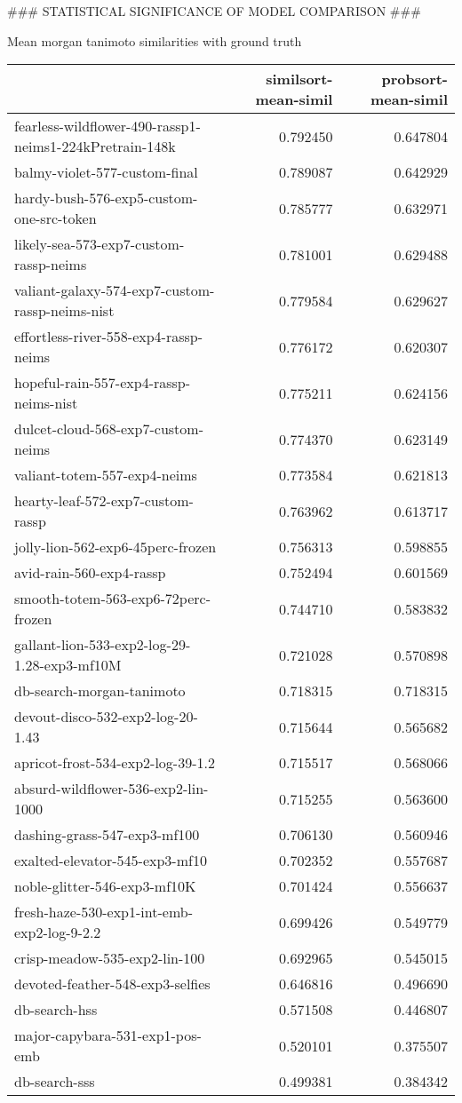### STATISTICAL SIGNIFICANCE OF MODEL COMPARISON ###


Mean morgan tanimoto similarities with ground truth
\begin{tabular}{lrr}
\toprule
 & similsort-mean-simil & probsort-mean-simil \\
\midrule
fearless-wildflower-490-rassp1-neims1-224kPretrain-148k & 0.792450 & 0.647804 \\
balmy-violet-577-custom-final & 0.789087 & 0.642929 \\
hardy-bush-576-exp5-custom-one-src-token & 0.785777 & 0.632971 \\
likely-sea-573-exp7-custom-rassp-neims & 0.781001 & 0.629488 \\
valiant-galaxy-574-exp7-custom-rassp-neims-nist & 0.779584 & 0.629627 \\
effortless-river-558-exp4-rassp-neims & 0.776172 & 0.620307 \\
hopeful-rain-557-exp4-rassp-neims-nist & 0.775211 & 0.624156 \\
dulcet-cloud-568-exp7-custom-neims & 0.774370 & 0.623149 \\
valiant-totem-557-exp4-neims & 0.773584 & 0.621813 \\
hearty-leaf-572-exp7-custom-rassp & 0.763962 & 0.613717 \\
jolly-lion-562-exp6-45perc-frozen & 0.756313 & 0.598855 \\
avid-rain-560-exp4-rassp & 0.752494 & 0.601569 \\
smooth-totem-563-exp6-72perc-frozen & 0.744710 & 0.583832 \\
gallant-lion-533-exp2-log-29-1.28-exp3-mf10M & 0.721028 & 0.570898 \\
db-search-morgan-tanimoto & 0.718315 & 0.718315 \\
devout-disco-532-exp2-log-20-1.43 & 0.715644 & 0.565682 \\
apricot-frost-534-exp2-log-39-1.2 & 0.715517 & 0.568066 \\
absurd-wildflower-536-exp2-lin-1000 & 0.715255 & 0.563600 \\
dashing-grass-547-exp3-mf100 & 0.706130 & 0.560946 \\
exalted-elevator-545-exp3-mf10 & 0.702352 & 0.557687 \\
noble-glitter-546-exp3-mf10K & 0.701424 & 0.556637 \\
fresh-haze-530-exp1-int-emb-exp2-log-9-2.2 & 0.699426 & 0.549779 \\
crisp-meadow-535-exp2-lin-100 & 0.692965 & 0.545015 \\
devoted-feather-548-exp3-selfies & 0.646816 & 0.496690 \\
db-search-hss & 0.571508 & 0.446807 \\
major-capybara-531-exp1-pos-emb & 0.520101 & 0.375507 \\
db-search-sss & 0.499381 & 0.384342 \\
\bottomrule
\end{tabular}


